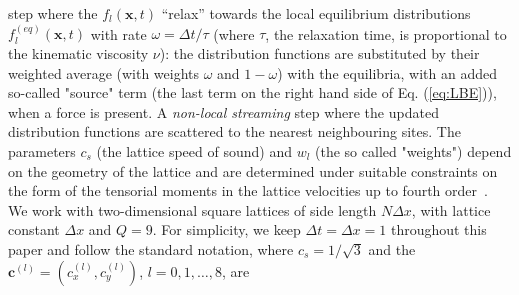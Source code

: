 step where the $f_l(\mathbf{x},t)$ ``relax'' towards the local equilibrium distributions
$f^{(eq)}_l(\mathbf{x},t)$ with rate  
$\omega = \Delta t/\tau$ (where $\tau$, the relaxation time, is proportional to the kinematic viscosity $\nu$): the distribution functions are substituted by their weighted average 
(with weights $\omega$ and $1-\omega$) 
with the equilibria, with an added so-called "source" term (the last term on the right hand side of Eq. (\ref{eq:LBE})), when a force is present. A {\it non-local streaming} step where the updated distribution functions are scattered to the nearest neighbouring sites. 
The parameters $c_s$ (the lattice speed of sound) and $w_l$ (the 
so called "weights")
depend on the geometry of the lattice and are determined under suitable constraints on 
the form of the tensorial moments in the lattice velocities up to fourth order~\cite{wolf-gladrow}.
We work with two-dimensional square lattices of side length $N\Delta x$, with lattice constant $\Delta x$ and $Q=9$.
For simplicity, we keep $\Delta t=\Delta x=1$ throughout this paper and follow the standard notation, where $c_s = 1/\sqrt{3}$ and the $\mathbf{c}^{(l)} = (c^{(l)}_x,c^{(l)}_y)$, $l=0,1,\dots,8$, are~\cite{qian-dhumieres-lallemand,shan_yuan_chen_2006} 

